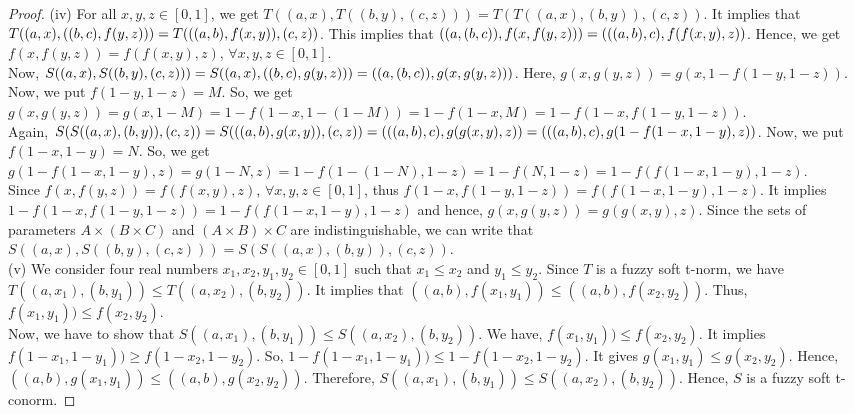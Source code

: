 \documentclass[10pt,a4paper]{amsart}
\begin{document}
\begin{proof}
    (iv) For all $x, y, z\in [0, 1]$, we get $T((a, x), T((b, y), (c, z)))=T(T((a, x), (b, y)), (c, z))$. It implies that $T((a, x), ((b, c), f(y, z))) = T(((a, b), \\f(x, y)), (c, z))$. This implies that $((a, (b, c)), f(x, f(y, z)))=(((a, b), c), f(f(x, y)\\, z))$. Hence, we get $f(x, f(y, z))=f(f(x, y), z)$, $\forall x, y, z \in [0, 1]$.\\

    Now, $S((a, x), S((b, y), (c, z)))=S((a, x), ((b, c), g(y, z)))=((a, (b, c)), g(x,\\ g(y, z)))$. Here, $g(x, g(y, z))=g(x, 1-f(1-y, 1-z))$. Now, we put $f(1-y, 1-z)=M$. So, we get $g(x, g(y, z))=g(x, 1-M)=1-f(1-x, 1-(1-M))=1-f(1-x, M)=1-f(1-x, f(1-y, 1-z))$.\\

    Again, $S(S((a, x), (b, y)), (c, z))=S(((a, b), g(x, y)), (c, z))=(((a, b), c), g(g\\(x, y), z))=(((a, b), c), g(1-f(1-x, 1-y), z))$. Now, we put $f(1-x, 1-y)=N$. So, we get $g(1-f(1-x, 1-y), z)=g(1-N, z)=1-f(1-(1-N), 1-z)=1-f(N, 1-z)=1-f(f(1-x, 1-y), 1-z)$.\\

    Since $f(x, f(y, z))=f(f(x, y), z)$, $\forall x, y, z \in [0, 1]$, thus $f(1-x, f(1-y, 1-z))=f(f(1-x, 1-y), 1-z)$. It implies  $1-f(1-x, f(1-y, 1-z))=1-f(f(1-x, 1-y), 1-z)$ and hence, $g(x, g(y, z))=g(g(x, y), z)$. Since the sets of parameters $A\times(B\times C)$ and $(A\times B)\times C$ are indistinguishable, we can write that $S((a, x), S((b, y), (c, z))) = S(S((a, x), (b, y)), (c, z))$.\\

    (v) We consider four real numbers $x_1, x_2, y_1, y_2 \in [0, 1]$ such that $x_1 \leq x_2$ and $y_1 \leq y_2$. Since $T$ is a fuzzy soft t-norm, we have $T((a, x_1), (b, y_1)) \leq T((a, x_2), (b, y_2))$. It implies that $((a, b), f(x_1, y_1))\leq ((a, b), f(x_2, y_2))$. Thus, $f(x_1, y_1))\leq f(x_2, y_2)$.\\

    Now, we have to show that $S((a, x_1), (b, y_1)) \leq S((a, x_2), (b, y_2))$. We have, $f(x_1, y_1))\leq f(x_2, y_2)$. It implies $  f(1-x_1, 1-y_1))\geq f(1-x_2, 1-y_2)$. So, $ 1-f(1-x_1, 1-y_1))\leq 1-f(1-x_2, 1-y_2)$. It gives $  g(x_1, y_1) \leq g(x_2, y_2)$. Hence, $((a, b), g(x_1, y_1))\leq ((a, b), g(x_2, y_2))$. Therefore, $S((a, x_1), (b, y_1)) \leq S((a, x_2), (b, y_2))$.     Hence, $S$ is a fuzzy soft t-conorm.
    
\end{proof}
\end{document}
